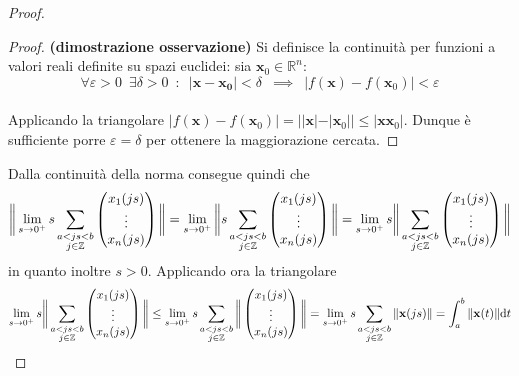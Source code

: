 \documentclass[10pt, oneside]{book}
\theoremstyle{plain}
\begin{document}
\begin{proof}
\begin{oss}
\end{oss}
\begin{proof}
\textbf{(dimostrazione osservazione)} Si definisce la continuità per funzioni a valori reali definite su spazi euclidei: sia $\mathbf{x}_0 \in \mathbb{R}^n$:  
\[\forall \varepsilon > 0 \enspace \exists \delta > 0 \enspace : \enspace |\mathbf{x} - \mathbf{x_0}| < \delta \enspace \implies \enspace |f(\mathbf{x}) - f(\mathbf{x}_0)| < \varepsilon\]
\\Applicando la triangolare $\displaystyle |f(\mathbf{x}) - f(\mathbf{x}_0)| = | |\mathbf{x}| - |\mathbf{x}_0| | \leq |\mathbf{x}\mathbf{x}_0|$. Dunque è sufficiente porre $\varepsilon = \delta$ per ottenere la maggiorazione cercata.
\end{proof}
Dalla continuità della norma consegue quindi che
\[\bigg{\|}\lim\limits_{s \rightarrow 0^+}s \sum_{\displaystyle \substack{a < js < b \\ j \in \mathbb{Z}}} \begin{pmatrix}
x_1(js)\\
\vdots\\
x_n(js)
\end{pmatrix}\bigg{\|} = \lim\limits_{s \rightarrow 0^+} \bigg{\|} s \sum_{\displaystyle \substack{a < js < b \\ j \in \mathbb{Z}}} \begin{pmatrix}
x_1(js)\\
\vdots\\
x_n(js)
\end{pmatrix}\bigg{\|} =  \lim\limits_{s \rightarrow 0^+} s \bigg{\|} \sum_{\displaystyle \substack{a < js < b \\ j \in \mathbb{Z}}} \begin{pmatrix}
x_1(js)\\
\vdots\\
x_n(js)
\end{pmatrix}\bigg{\|}\]
in quanto inoltre $s > 0$. Applicando ora la triangolare 
\[\lim\limits_{s \rightarrow 0^+} s \bigg{\|} \sum_{\displaystyle \substack{a < js < b \\ j \in \mathbb{Z}}} \begin{pmatrix}
x_1(js)\\
\vdots\\
x_n(js)
\end{pmatrix}\bigg{\|} \leq \lim\limits_{s \rightarrow 0^+} s \sum_{\displaystyle \substack{a < js < b \\ j \in \mathbb{Z}}} \bigg{\|}  \begin{pmatrix}
x_1(js)\\
\vdots\\
x_n(js)
\end{pmatrix}\bigg{\|} = \lim\limits_{s \rightarrow 0^+} s \sum_{\displaystyle \substack{a < js < b \\ j \in \mathbb{Z}}} \|\mathbf{x}(js)\| = \int_{a}^{b}\|\mathbf{x}(t)\|\textrm{d}t\]
\end{proof}
\end{document}
